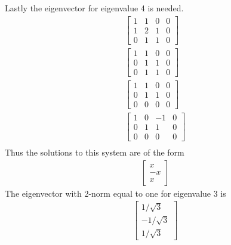 \documentclass[11pt]{article}
\begin{document}
\begin{enumerate}
\begin{enumerate}
                Lastly the eigenvector for eigenvalue 4 is needed.
                \begin{align*}
                    \begin{bmatrix}
                        1 & 1 & 0 & 0 \\
                        1 & 2 & 1 & 0 \\
                        0 & 1 & 1 & 0
                    \end{bmatrix} \\
                    \begin{bmatrix}
                        1 & 1 & 0 & 0 \\
                        0 & 1 & 1 & 0 \\
                        0 & 1 & 1 & 0
                    \end{bmatrix} \\
                    \begin{bmatrix}
                        1 & 1 & 0 & 0 \\
                        0 & 1 & 1 & 0 \\
                        0 & 0 & 0 & 0
                    \end{bmatrix} \\
                    \begin{bmatrix}
                        1 & 0 & -1 & 0 \\
                        0 & 1 & 1 & 0 \\
                        0 & 0 & 0 & 0
                    \end{bmatrix} \\
                \end{align*}
                Thus the solutions to this system are of the form
                \begin{align*}
                    \begin{bmatrix}
                        x \\
                        -x \\
                        x
                    \end{bmatrix}
                \end{align*}
                The eigenvector with 2-norm equal to one for eigenvalue 3 is
                \begin{align*}
                    \begin{bmatrix}
                        1/\sqrt{3} \\
                        -1/\sqrt{3} \\
                        1/\sqrt{3}
                    \end{bmatrix}
                \end{align*}


\end{enumerate}
\end{enumerate}
\end{document}
